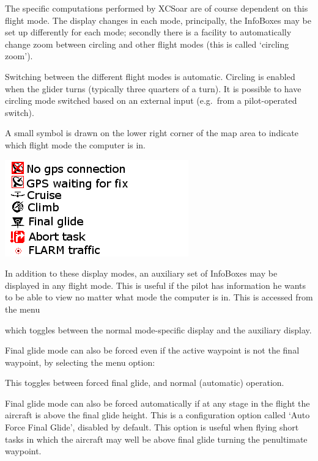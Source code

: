 \documentclass[a4paper,12pt]{refrep}
\begin{document}
The specific computations performed by XCSoar are of course dependent
on this flight mode.  The display changes in each mode, principally,
the InfoBoxes may be set up differently for each mode; secondly there
is a facility to automatically change zoom between circling and other
flight modes (this is called `circling zoom').

Switching between the different flight modes is automatic.  Circling
is enabled when the glider turns (typically three quarters of a turn).
It is possible to have circling mode switched based on an external
input (e.g.\ from a pilot-operated switch).

A small symbol is drawn on the lower right corner of the map area to
indicate which flight mode the computer is in.

\includegraphics[angle=0,width=0.7\linewidth,keepaspectratio='true']{figures/symbology.png}

In addition to these display modes, an auxiliary set of InfoBoxes may
be displayed in any flight mode.  This is useful if the pilot has
information he wants to be able to view no matter what mode the
computer is in.  This is accessed from the menu
\begin{quote}
\blink{}
\end{quote}

which toggles between the normal mode-specific display and
the auxiliary display.

Final glide mode can also be forced even if the active waypoint is not
the final waypoint, by selecting the menu option:
\begin{quote}
\blink{}
\end{quote}
This toggles between forced final glide, and normal (automatic) operation.

Final glide mode can also be forced automatically if at any stage in
the flight the aircraft is above the final glide height.  This is a
configuration option called `Auto Force Final Glide', disabled by
default.  This option is useful when flying short tasks in which the
aircraft may well be above final glide turning the penultimate
waypoint.
\end{document}
